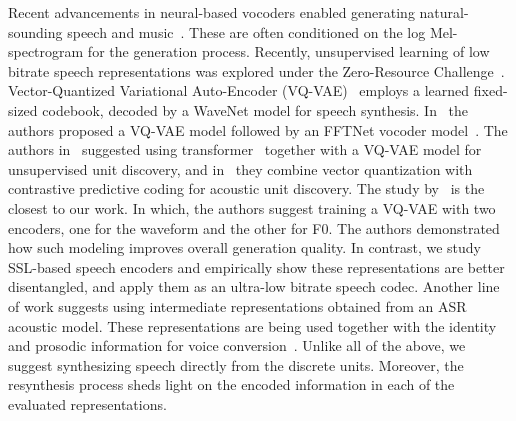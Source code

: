 Recent advancements in neural-based vocoders enabled generating natural-sounding speech and music~\cite{oord2016wavenet, prenger2019waveglow, kong2020hifi}. These are often conditioned on the log Mel-spectrogram for the generation process. 
Recently, unsupervised learning of low bitrate speech representations was explored under the Zero-Resource Challenge~\cite{dunbar2019zero, dunbar2020zero}.
Vector-Quantized Variational Auto-Encoder (VQ-VAE)~\cite{van2017neural} employs a learned fixed-sized codebook, decoded by a WaveNet model for speech synthesis. In~\cite{eloff2019unsupervised} the authors proposed a VQ-VAE model followed by an FFTNet vocoder model~\cite{jin2018fftnet}. The authors in~\cite{tjandra2020transformer} suggested using transformer~\cite{trans} together with a VQ-VAE model for unsupervised unit discovery, and in~\cite{van2020vector} they combine vector quantization with contrastive predictive coding for acoustic unit discovery. The study by~\cite{zhao2020improved} is the closest to our work. In which, the authors suggest training a VQ-VAE with two encoders, one for the waveform and the other for F0. The authors demonstrated how such modeling improves overall generation quality. In contrast, we study SSL-based speech encoders and empirically show these representations are better disentangled, and apply them as an ultra-low bitrate speech codec. Another line of work suggests using intermediate representations obtained from an ASR acoustic model. These representations are being used together with the identity and prosodic information for voice conversion~\cite{polyak2019tts, polyak2020unsupervised, polyak2021high}. Unlike all of the above, we suggest synthesizing speech directly from the discrete units. Moreover, the resynthesis process sheds light on the encoded information in each of the evaluated representations. 

